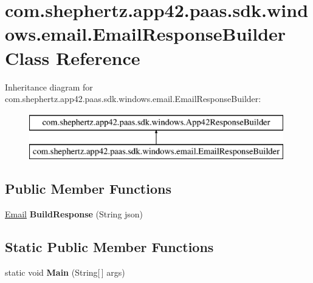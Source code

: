 \hypertarget{classcom_1_1shephertz_1_1app42_1_1paas_1_1sdk_1_1windows_1_1email_1_1_email_response_builder}{\section{com.\+shephertz.\+app42.\+paas.\+sdk.\+windows.\+email.\+Email\+Response\+Builder Class Reference}
\label{classcom_1_1shephertz_1_1app42_1_1paas_1_1sdk_1_1windows_1_1email_1_1_email_response_builder}
}
Inheritance diagram for com.\+shephertz.\+app42.\+paas.\+sdk.\+windows.\+email.\+Email\+Response\+Builder\+:\begin{figure}[H]
\begin{center}
\leavevmode
\includegraphics[height=2.000000cm]{classcom_1_1shephertz_1_1app42_1_1paas_1_1sdk_1_1windows_1_1email_1_1_email_response_builder}
\end{center}
\end{figure}
\subsection*{Public Member Functions}
\begin{DoxyCompactItemize}
\item 
\hypertarget{classcom_1_1shephertz_1_1app42_1_1paas_1_1sdk_1_1windows_1_1email_1_1_email_response_builder_a4ce1654f45659067d55220ec1d054e5d}{\hyperlink{classcom_1_1shephertz_1_1app42_1_1paas_1_1sdk_1_1windows_1_1email_1_1_email}{Email} {\bfseries Build\+Response} (String json)}\label{classcom_1_1shephertz_1_1app42_1_1paas_1_1sdk_1_1windows_1_1email_1_1_email_response_builder_a4ce1654f45659067d55220ec1d054e5d}

\end{DoxyCompactItemize}
\subsection*{Static Public Member Functions}
\begin{DoxyCompactItemize}
\item 
\hypertarget{classcom_1_1shephertz_1_1app42_1_1paas_1_1sdk_1_1windows_1_1email_1_1_email_response_builder_a7fac135ec938868916f7012b52583e5b}{static void {\bfseries Main} (String\mbox{[}$\,$\mbox{]} args)}\label{classcom_1_1shephertz_1_1app42_1_1paas_1_1sdk_1_1windows_1_1email_1_1_email_response_builder_a7fac135ec938868916f7012b52583e5b}

\end{DoxyCompactItemize}
